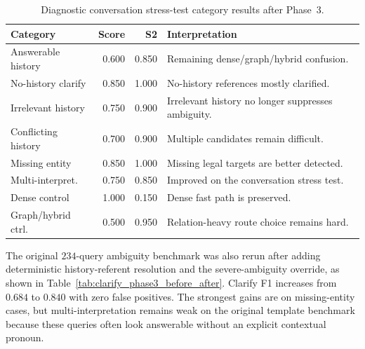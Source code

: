 \documentclass[11pt,twocolumn]{article}
\begin{document}
\begin{table}[!htbp]
\centering
\caption{Diagnostic conversation stress-test category results after Phase~3.}
\label{tab:conversation_category_results}
\scriptsize
\setlength{\tabcolsep}{2.0pt}
\begin{tabularx}{\columnwidth}{L{2.45cm}rrY}
\toprule
\textbf{Category} & \textbf{Score} & \textbf{S2} & \textbf{Interpretation} \\
\midrule
Answerable history & 0.600 & 0.850 & Remaining dense/graph/hybrid confusion. \\
No-history clarify & 0.850 & 1.000 & No-history references mostly clarified. \\
Irrelevant history & 0.750 & 0.900 & Irrelevant history no longer suppresses ambiguity. \\
Conflicting history & 0.700 & 0.900 & Multiple candidates remain difficult. \\
Missing entity & 0.850 & 1.000 & Missing legal targets are better detected. \\
Multi-interpret. & 0.750 & 0.850 & Improved on the conversation stress test. \\
Dense control & 1.000 & 0.150 & Dense fast path is preserved. \\
Graph/hybrid ctrl. & 0.500 & 0.950 & Relation-heavy route choice remains hard. \\
\bottomrule
\end{tabularx}
\end{table}

The original $234$-query ambiguity benchmark was also rerun
after adding deterministic history-referent resolution and the
severe-ambiguity override, as shown in
Table~\ref{tab:clarify_phase3_before_after}. Clarify F1
increases from $0.684$ to $0.840$ with zero false positives.
The strongest gains are on missing-entity cases, but
multi-interpretation remains weak on the original template
benchmark because these queries often look answerable without
an explicit contextual pronoun.

\begin{table}[!htbp]
\centering
\caption{Original ambiguity benchmark before and after deterministic history-referent resolution and severe-ambiguity override.}
\label{tab:clarify_phase3_before_after}
\scriptsize
\setlength{\tabcolsep}{2.5pt}
\end{table}
\end{document}
